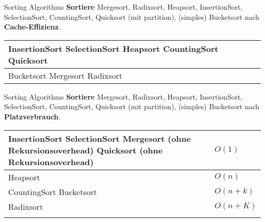 \begin{frame}{Sorting Algorithms}
	\textbf{Sortiere} Mergesort, Radixsort, Heapsort, InsertionSort, SelectionSort, CountingSort, Quicksort {\small (mit partition)}, (simples) Bucketsort nach \textbf{Cache-Effizienz}. \\
	\pause
	\forcenewline
	\centering
	\begin{tabular}{m{.3\linewidth} | m{.2\linewidth} |}
		\hline
		InsertionSort \newline 
		SelectionSort \newline
		Heapsort \newline
		CountingSort \newline
		Quicksort & \YesCell \\
		\hline
		Bucketsort \newline
		Mergesort \newline
		Radixsort & \NoCell \\
		\hline
	\end{tabular}
\end{frame}

\begin{frame}{Sorting Algorithms}
	\textbf{Sortiere} Mergesort, Radixsort, Heapsort, InsertionSort, SelectionSort, CountingSort, Quicksort {\small (mit partition)}, (simples) Bucketsort nach \textbf{Platzverbrauch}. \\
	\pause
	\forcenewline
	\centering
	\begin{tabular}{m{.55\linewidth} | m{.15\linewidth} }
		\hhline{=|=}
		InsertionSort \newline 
		SelectionSort \newline
		Mergesort (ohne Rekursionsoverhead) \newline
		Quicksort (ohne Rekursionsoverhead) & $O(1)$ \\
		\hline
		Heapsort & $O(n)$ \\
		\hhline{=|=}
		CountingSort \newline 
		Bucketsort & $O(n+k)$ \\
		\hhline{=|=}
		Radixsort & $O(n+K)$ \\
		\hhline{=|=}
	\end{tabular}
\end{frame}

